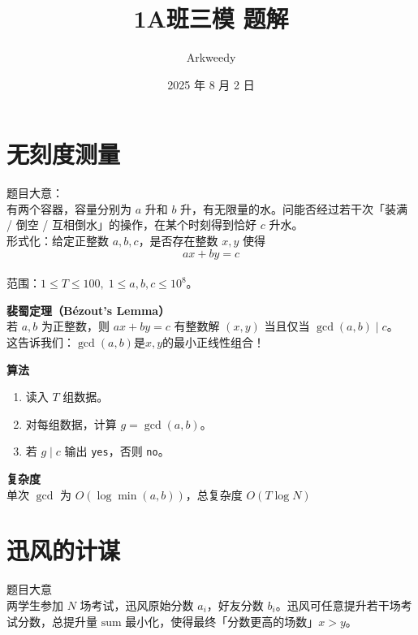 \documentclass[11pt]{beamer}
\title{1A班三模 题解}
\author{Arkweedy}
\date{2025 年 8 月 2 日}
\begin{document}
\begin{frame}
  \titlepage
\end{frame}




\section{无刻度测量}
\begin{frame}
题目大意：\\
有两个容器，容量分别为 $a$ 升和 $b$ 升，有无限量的水。问能否经过若干次「装满 / 倒空 / 互相倒水」的操作，在某个时刻得到恰好 $c$ 升水。\\
形式化：给定正整数 $a,b,c$，是否存在整数 $x,y$ 使得 $$ax+by=c$$\\
范围：$1\le T\le 100,\;1\le a,b,c\le 10^8$。
\end{frame}

\begin{frame}
\textbf{裴蜀定理（Bézout's Lemma）}\\
若 $a,b$ 为正整数，则 $ax+by=c$ 有整数解 $(x,y)$ 当且仅当 $\gcd(a,b)\mid c$。\\
这告诉我们：$\gcd(a,b)$是$x,y$的最小正线性组合！

\end{frame}

\begin{frame}
\textbf{算法}\\
\begin{enumerate}
  \item 读入 $T$ 组数据。
  \item 对每组数据，计算 $g=\gcd(a,b)$。
  \item 若 $g\mid c$ 输出 \texttt{yes}，否则 \texttt{no}。
\end{enumerate}

\textbf{复杂度}\\
单次 $\gcd$ 为 $O(\log\min(a,b))$，总复杂度 $O(T\log N)$
\end{frame}

\section{迅风的计谋}
\begin{frame}
题目大意\\
两学生参加 $N$ 场考试，迅风原始分数 $a_i$，好友分数 $b_i$。迅风可任意提升若干场考试分数，总提升量 $\text{sum}$ 最小化，使得最终「分数更高的场数」$x>y$。
\end{frame}
\end{document}
